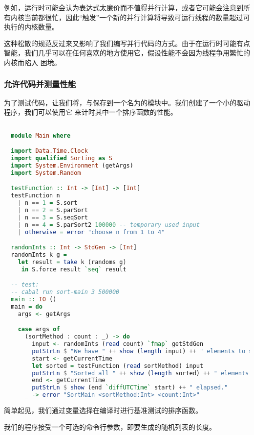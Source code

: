 \documentclass[./main.tex]{subfiles}
\begin{document}
例如，运行时可能会认为表达式太廉价而不值得并行计算，或者它可能会注意到所有内核当前都很忙，因此“触发”一个新的并行计算将导致可运行线程的数量超过可执行的内核数量。

这种松散的规范反过来又影响了我们编写并行代码的方式。由于在运行时可能有点智能，我们几乎可以在任何喜欢的地方使用它，假设性能不会因为线程争用繁忙的内核而陷入
困境。

\subsubsection*{允许代码并测量性能}

为了测试代码，让我们将，与保存到一个名为的模块中。我们创建了一个小的驱动程序，我们可以使用它
来计时其中一个排序函数的性能。

\begin{lstlisting}[language=Haskell]

  module Main where

  import Data.Time.Clock
  import qualified Sorting as S
  import System.Environment (getArgs)
  import System.Random

  testFunction :: Int -> [Int] -> [Int]
  testFunction n
    | n == 1 = S.sort
    | n == 2 = S.parSort
    | n == 3 = S.seqSort
    | n == 4 = S.parSort2 100000 -- temporary used input
    | otherwise = error "choose n from 1 to 4"

  randomInts :: Int -> StdGen -> [Int]
  randomInts k g =
    let result = take k (randoms g)
     in S.force result `seq` result

  -- test:
  -- cabal run sort-main 3 500000
  main :: IO ()
  main = do
    args <- getArgs

    case args of
      (sortMethod : count : _) -> do
        input <- randomInts (read count) `fmap` getStdGen
        putStrLn $ "We have " ++ show (length input) ++ " elements to sort."
        start <- getCurrentTime
        let sorted = testFunction (read sortMethod) input
        putStrLn $ "Sorted all " ++ show (length sorted) ++ " elements."
        end <- getCurrentTime
        putStrLn $ show (end `diffUTCTime` start) ++ " elapsed."
      _ -> error "SortMain <sortMethod:Int> <count:Int>"
\end{lstlisting}

简单起见，我们通过变量选择在编译时进行基准测试的排序函数。

我们的程序接受一个可选的命令行参数，即要生成的随机列表的长度。
\end{document}
